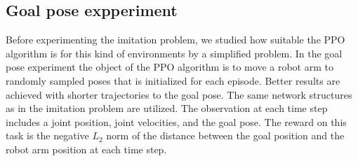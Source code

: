 \subsection{Goal pose expperiment}

Before experimenting the imitation problem, we studied how suitable the PPO algorithm is for this kind of environments by a simplified problem. In the goal pose experiment the object of the PPO algorithm is to move a robot arm to randomly sampled poses that is initialized for each episode. Better results are achieved with shorter trajectories to the goal pose. The same network structures as in the imitation problem are utilized. The observation at each time step includes a joint position, joint velocities, and the goal pose. The reward on this task is the negative $L_2$ norm of the distance between the goal position and the robot arm position at each time step.